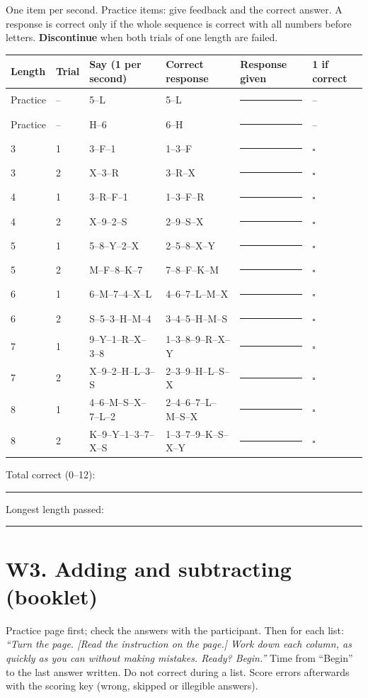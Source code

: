 \documentclass[10pt,a4paper]{article}
\newcommand{\blank}[1][1.2cm]{\rule{#1}{0.4pt}}
\newcommand{\bx}{$\square$}
\begin{document}
One item per second. Practice items: give feedback and the correct answer. A response is correct only if the whole sequence is correct with all numbers before letters. \textbf{Discontinue} when both trials of one length are failed.
\begin{longtable}{@{}llp{4.2cm}p{4.2cm}p{3.4cm}l@{}}\toprule Length & Trial & Say (1 per second) & Correct response & Response given & 1 if correct\\ \midrule\endhead
Practice & -- & 5--L & 5--L & \blank[3.2cm] & --\\
Practice & -- & H--6 & 6--H & \blank[3.2cm] & --\\
\midrule
3 & 1 & 3--F--1 & 1--3--F & \blank[3.2cm] & \bx\\
3 & 2 & X--3--R & 3--R--X & \blank[3.2cm] & \bx\\\midrule
4 & 1 & 3--R--F--1 & 1--3--F--R & \blank[3.2cm] & \bx\\
4 & 2 & X--9--2--S & 2--9--S--X & \blank[3.2cm] & \bx\\\midrule
5 & 1 & 5--8--Y--2--X & 2--5--8--X--Y & \blank[3.2cm] & \bx\\
5 & 2 & M--F--8--K--7 & 7--8--F--K--M & \blank[3.2cm] & \bx\\\midrule
6 & 1 & 6--M--7--4--X--L & 4--6--7--L--M--X & \blank[3.2cm] & \bx\\
6 & 2 & S--5--3--H--M--4 & 3--4--5--H--M--S & \blank[3.2cm] & \bx\\\midrule
7 & 1 & 9--Y--1--R--X--3--8 & 1--3--8--9--R--X--Y & \blank[3.2cm] & \bx\\
7 & 2 & X--9--2--H--L--3--S & 2--3--9--H--L--S--X & \blank[3.2cm] & \bx\\\midrule
8 & 1 & 4--6--M--S--X--7--L--2 & 2--4--6--7--L--M--S--X & \blank[3.2cm] & \bx\\
8 & 2 & K--9--Y--1--3--7--X--S & 1--3--7--9--K--S--X--Y & \blank[3.2cm] & \bx\\\midrule
\bottomrule\end{longtable}
Total correct (0--12): \blank \quad Longest length passed: \blank
\section*{W3. Adding and subtracting (booklet)}
Practice page first; check the answers with the participant. Then for each list: \textit{``Turn the page. [Read the instruction on the page.] Work down each column, as quickly as you can without making mistakes. Ready? Begin.''} Time from ``Begin'' to the last answer written. Do not correct during a list. Score errors afterwards with the scoring key (wrong, skipped or illegible answers).
\end{document}
